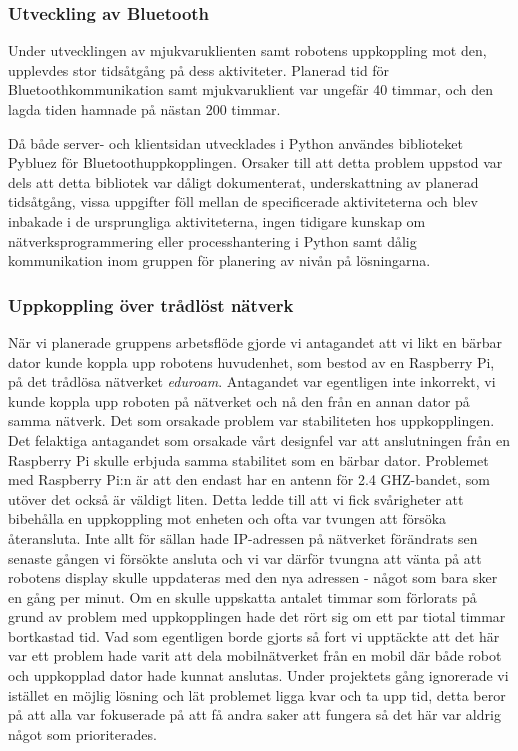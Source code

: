 \documentclass{article}
\begin{document}
\subsubsection{Utveckling av Bluetooth}
Under utvecklingen av mjukvaruklienten samt robotens uppkoppling mot den, upplevdes stor tidsåtgång på dess aktiviteter. Planerad tid för Bluetoothkommunikation samt mjukvaruklient var ungefär 40 timmar, och den lagda tiden hamnade på nästan 200 timmar. 

Då både server- och klientsidan utvecklades i Python användes biblioteket Pybluez för Bluetoothuppkopplingen. Orsaker till att detta problem uppstod var dels att detta bibliotek var dåligt dokumenterat, underskattning av planerad tidsåtgång, vissa uppgifter föll mellan de specificerade aktiviteterna och blev inbakade i de ursprungliga aktiviteterna, ingen tidigare kunskap om nätverksprogrammering eller processhantering i Python samt dålig kommunikation inom gruppen för planering av nivån på lösningarna. 

\subsubsection{Uppkoppling över trådlöst nätverk}
När vi planerade gruppens arbetsflöde gjorde vi antagandet att vi likt en bärbar dator kunde koppla upp robotens huvudenhet, som bestod av en Raspberry Pi, på det trådlösa nätverket \textit{eduroam}. Antagandet var egentligen inte inkorrekt, vi kunde koppla upp roboten på nätverket och nå den från en annan dator på samma nätverk. Det som orsakade problem var stabiliteten hos uppkopplingen.
\newline\newline
Det felaktiga antagandet som orsakade vårt designfel var att anslutningen från en Raspberry Pi skulle erbjuda samma stabilitet som en bärbar dator. Problemet med Raspberry Pi:n är att den endast har en antenn för 2.4 GHZ-bandet, som utöver det också är väldigt liten. Detta ledde till att vi fick svårigheter att bibehålla en uppkoppling mot enheten och ofta var tvungen att försöka återansluta. Inte allt för sällan hade IP-adressen på nätverket förändrats sen senaste gången vi försökte ansluta och vi var därför tvungna att vänta på att robotens display skulle uppdateras med den nya adressen - något som bara sker en gång per minut.
\newline\newline
Om en skulle uppskatta antalet timmar som förlorats på grund av problem med uppkopplingen hade det rört sig om ett par tiotal timmar bortkastad tid. Vad som egentligen borde gjorts så fort vi upptäckte att det här var ett problem hade varit att dela mobilnätverket från en mobil där både robot och uppkopplad dator hade kunnat anslutas. Under projektets gång ignorerade vi istället en möjlig lösning och lät problemet ligga kvar och ta upp tid, detta beror på att alla var fokuserade på att få andra saker att fungera så det här var aldrig något som prioriterades.
\end{document}
